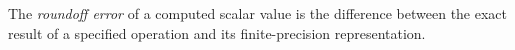 
The \emph{roundoff error} of a computed scalar value is the difference between the exact result of a specified operation and its finite-precision representation.
